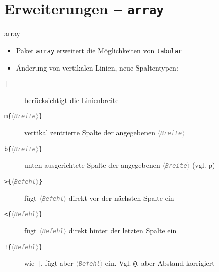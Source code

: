 \documentclass{beamer}
\newcommand{\meta}[1]{\textcolor{gray}{$\langle$\texttt{\textsl{#1}}$\rangle$}}
\begin{document}
\section[array]{Erweiterungen – \texttt{array}}
\begin{frame}[fragile]{array}
\begin{itemize}
\item Paket \verb/array/ erweitert die Möglichkeiten von \verb/tabular/
\item Änderung von vertikalen Linien, neue Spaltentypen:
\end{itemize}
\begin{description}
\item[\texttt{|}] berücksichtigt die Linienbreite
\item[\texttt{m\{\meta{Breite}\}}] vertikal zentrierte Spalte der angegebenen \meta{Breite}
\item[\texttt{b\{\meta{Breite}\}}] unten ausgerichtete Spalte der angegebenen \meta{Breite} (vgl. p)
\item[\texttt{>\{\meta{Befehl}\}}] fügt \meta{Befehl} direkt vor der nächsten Spalte ein
\item[\texttt{<\{\meta{Befehl}\}}] fügt \meta{Befehl} direkt hinter der letzten Spalte ein
\item[\texttt{!\{\meta{Befehl}\}}] wie \verb/|/, fügt aber \meta{Befehl} ein. Vgl. \verb/@/, aber Abstand korrigiert
\end{description}
\end{frame}
\end{document}
